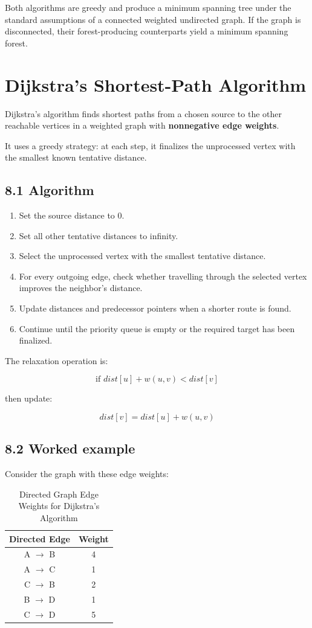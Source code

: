 Both algorithms are greedy and produce a minimum spanning tree under the standard assumptions of a connected weighted undirected graph. If the graph is disconnected, their forest-producing counterparts yield a minimum spanning forest.

\section{Dijkstra's Shortest-Path Algorithm}

Dijkstra's algorithm finds shortest paths from a chosen source to the other reachable vertices in a weighted graph with \textbf{nonnegative edge weights}.

It uses a greedy strategy: at each step, it finalizes the unprocessed vertex with the smallest known tentative distance.

\subsection{8.1 Algorithm}

\begin{enumerate}
    \item Set the source distance to 0.
    \item Set all other tentative distances to infinity.
    \item Select the unprocessed vertex with the smallest tentative distance.
    \item For every outgoing edge, check whether travelling through the selected vertex improves the neighbor's distance.
    \item Update distances and predecessor pointers when a shorter route is found.
    \item Continue until the priority queue is empty or the required target has been finalized.
\end{enumerate}

The relaxation operation is:


\[
\boxed{\text{if }dist[u]+w(u,v)<dist[v]}
\]


then update:


\[
dist[v]=dist[u]+w(u,v)
\]


\subsection{8.2 Worked example}

Consider the graph with these edge weights:

\begin{table}[htbp]
\centering
\caption{Directed Graph Edge Weights for Dijkstra's Algorithm}
\label{tab:dijkstra_edges}
\begin{tabular}{cc}
\toprule
\textbf{Directed Edge} & \textbf{Weight} \\
\midrule
A $\to$ B & 4 \\
A $\to$ C & 1 \\
C $\to$ B & 2 \\
B $\to$ D & 1 \\
C $\to$ D & 5 \\
\bottomrule
\end{tabular}
\end{table}

